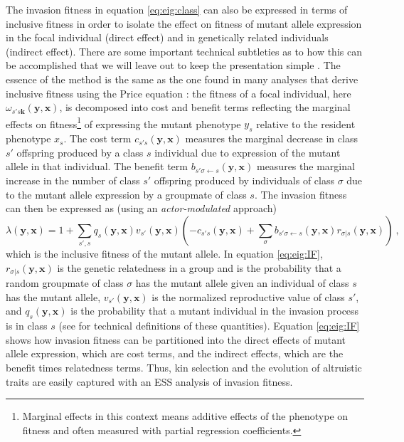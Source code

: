 \documentclass[11pt]{article}
\renewcommand{\vec}[1]{\symbf{#1}}
\newcommand{\eig}{\lambda}
\begin{document}
The invasion fitness in equation \eqref{eq:eig:class} can also be expressed in terms of inclusive fitness in order to isolate the effect on fitness of mutant allele expression in the focal individual (direct effect) and in genetically related individuals (indirect effect). There are some important technical subtleties as to how this can be accomplished that we will leave out to keep the presentation simple \cite[see ``Supplement B'' in][for details]{Lehmann:Rousset:2020}. The essence of the method is the same as the one found in many analyses that derive inclusive fitness using the Price equation \cite[e.g.,][]{Queller:1992,Frank:1998,Lehmann:Keller:2006,Akcay:VanCleve:2012}: the fitness of a focal individual, here $\omega_{s'\!s\vec{k}}(\vec{y}, \vec{x})$, is decomposed into cost and benefit terms reflecting the marginal effects on fitness\footnote{Marginal effects in this context means additive effects of the phenotype on fitness and often measured with partial regression coefficients.} of expressing the mutant phenotype $y_{s}$ relative to the resident phenotype $x_{s}$. The cost term $c_{s'\!s}(\vec{y}, \vec{x})$ measures the marginal decrease in class $s'$ offspring produced by a class $s$ individual due to expression of the mutant allele in that individual. The benefit term $b_{s'\!\sigma \leftarrow s}(\vec{y}, \vec{x})$ measures the marginal increase in the number of class $s'$ offspring produced by individuals of class $\sigma$ due to the mutant allele expression by a groupmate of class $s$. The invasion fitness can then be expressed as (using an \textit{actor-modulated} approach) \cite{Lehmann:Rousset:2020}
\begin{equation}
  \label{eq:eig:IF}
  \eig(\vec{y}, \vec{x}) = 1 + \sum_{s'\!,s} q_{s}(\vec{y}, \vec{x}) v_{s'}(\vec{y}, \vec{x})
  \left( - c_{s'\!s}(\vec{y}, \vec{x}) + \sum_{\sigma} b_{s'\!\sigma \leftarrow s}(\vec{y}, \vec{x}) r_{\sigma|s}(\vec{y}, \vec{x}) \right) \: ,
\end{equation}
which is the inclusive fitness \cite{Hamilton:1964} of the mutant allele. In equation \eqref{eq:eig:IF}, $r_{\sigma|s}(\vec{y}, \vec{x})$ is the genetic relatedness in a group and is the probability that a random groupmate of class $\sigma$ has the mutant allele given an individual of class $s$ has the mutant allele, $v_{s'}(\vec{y}, \vec{x})$ is the normalized reproductive value of class $s'$, and $q_{s}(\vec{y}, \vec{x})$ is the probability that a mutant individual in the invasion process is in class $s$ (see \cite{Lehmann:Rousset:2020} for technical definitions of these quantities). Equation \eqref{eq:eig:IF} shows how invasion fitness can be partitioned into the direct effects of mutant allele expression, which are cost terms, and the indirect effects, which are the benefit times relatedness terms. Thus, kin selection and the evolution of altruistic traits are easily captured with an ESS analysis of invasion fitness.
\end{document}
